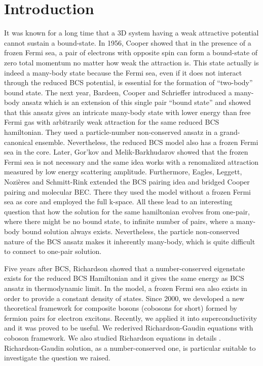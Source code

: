\documentclass[aps,prb,showpacs,reprint]{revtex4-1}
\begin{document}
\section{Introduction}
It was known for a long time that a 3D system having a weak attractive potential cannot sustain a bound-state.  In 1956, Cooper showed that in the presence of a frozen Fermi sea, a pair of electrons with opposite spin can form a bound-state of zero total momentum  no matter how weak the attraction is\cite{Cooper}.  This state actually is indeed a many-body state because the  Fermi sea, even if it does not interact through the reduced BCS potential,  is essential for the formation of ``two-body'' bound state.   The next year, Bardeen, Cooper and Schrieffer introduced a many-body ansatz which is an extension of this single pair ``bound state'' and showed that this ansatz gives an intricate many-body state with lower energy than free Fermi gas with arbitrarily weak attraction\cite{BCS} for the same reduced BCS hamiltonian.  They used a particle-number non-conserved ansatz in a grand-canonical ensemble.  Nevertheless, the reduced BCS model also has a frozen Fermi sea in the core. Later,   Gor'kov and Melik-Barkhudarov showed that the frozen Fermi sea is not necessary and the same idea works with a renomalized attraction measured by low energy scattering amplitude\cite{Gorkov}.   Furthermore, Eagles\cite{Eagle}, Leggett\cite{LeggettCrossover}, Nozi\`{e}res and Schmitt-Rink\cite{Nozieres} extended the BCS pairing idea and bridged Cooper pairing and molecular BEC. There they used the model without a frozen Fermi sea as core and employed the full k-space.  All these lead to an interesting question that how the solution for the same hamiltonian evolves from one-pair, where there might be no bound state, to infinite number of pairs, where a many-body bound solution always exists.  Nevertheless, the particle non-conserved nature of the BCS ansatz makes it inherently many-body, which is quite difficult to connect to one-pair solution.  

Five years after BCS, Richardson showed that a number-conserved eigenstate exists for the reduced BCS Hamiltonian and it gives the same energy as BCS ansatz in thermodynamic limit\cite{Richardson1,Richardson2,Richardson3,Richardson1968,gaudin}.  In the model, a frozen Fermi sea also exists in order to provide a constant density of states.  Since 2000, we developed a new theoretical framework for composite bosons (cobosons for short) formed by fermion pairs for electron excitons\cite{CobosonPhysicsReports}.   Recently, we applied it into superconductivity and it was proved to be useful.  We rederived Richardson-Gaudin equations with coboson framework\cite{CobosonBcsRich}. We also studied Richardson equations in details \cite{CombescotCooper,combescotBCS}.  Richardson-Gaudin solution, as a number-conserved one, is  particular suitable to investigate the question we raised.  
\end{document}
